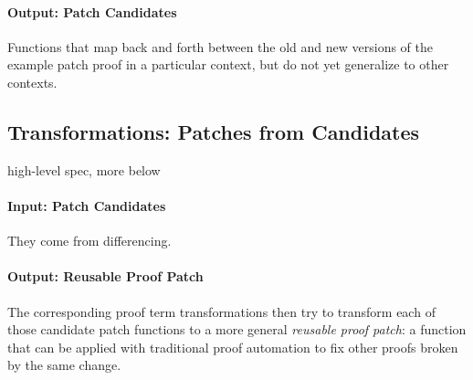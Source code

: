 \paragraph{Output: Patch Candidates}
Functions that map back and forth between the old and new versions
of the example patch proof in a particular context, but do not yet generalize to other contexts.

\subsection{Transformations: Patches from Candidates}
\label{sec:pumpkin-spec-trans}

high-level spec, more below

\paragraph{Input: Patch Candidates}
They come from differencing.

\paragraph{Output: Reusable Proof Patch}
The corresponding proof term transformations then try to transform each of those candidate patch functions to a more general \textit{reusable proof patch}:
a function that can be applied with traditional proof automation to fix other proofs broken by the same change.


